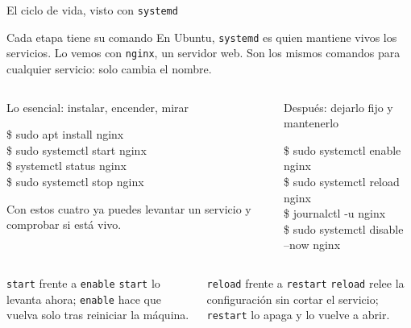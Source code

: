 \documentclass[aspectratio=169,10pt,c]{beamer}
\begin{document}
\begin{frame}{El ciclo de vida, visto con \texttt{systemd}}
\begin{block}{Cada etapa tiene su comando}
\small En Ubuntu, \texttt{systemd} es quien mantiene vivos los servicios. Lo vemos con \texttt{nginx}, un servidor web. Son los mismos comandos para cualquier servicio: solo cambia el nombre.
\end{block}
\begin{columns}[T,onlytextwidth]
\begin{exampleblock}{Lo esencial: instalar, encender, mirar}
\begin{terminal}\footnotesize
\$ sudo apt install nginx\\
\$ sudo systemctl start nginx\\
\$ systemctl status nginx\\
\$ sudo systemctl stop nginx
\end{terminal}
\small Con estos cuatro ya puedes levantar un servicio y comprobar si está vivo.
\end{exampleblock}
\begin{exampleblock}{Después: dejarlo fijo y mantenerlo}
\begin{terminal}\footnotesize
\$ sudo systemctl enable nginx\\
\$ sudo systemctl reload nginx\\
\$ journalctl -u nginx\\
\$ sudo systemctl disable --now nginx
\end{terminal}
\end{exampleblock}
\end{columns}
\begin{columns}[T,onlytextwidth]
\begin{block}{\texttt{start} frente a \texttt{enable}}
\small \texttt{start} lo levanta ahora; \texttt{enable} hace que vuelva solo tras reiniciar la máquina.
\end{block}
\begin{block}{\texttt{reload} frente a \texttt{restart}}
\small \texttt{reload} relee la configuración sin cortar el servicio; \texttt{restart} lo apaga y lo vuelve a abrir.
\end{block}
\end{columns}
\end{frame}
\end{document}
